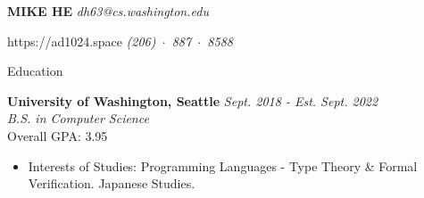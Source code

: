 \documentclass{resume}
\begin{document}
\MakeUppercase{\Large{\textbf{Mike He}}} \hfill {\em{dh63@cs.washington.edu}}
\vspace{-5pt}

https://ad1024.space \hfill{\em (206)~$\cdot$~887~$\cdot$~8588}


	\begin{rSection}{Education}

	{\bf University of Washington, Seattle} \hfill {\em Sept. 2018 - Est. Sept. 2022} \\
	\textit{B.S. in Computer Science} \\
	Overall GPA: 3.95
	\vspace{-5pt}
	\begin{itemize}[leftmargin=*]
		\setlength{\itemsep}{1pt}
		\setlength{\parskip}{0pt}
		\setlength{\parsep}{0pt}
		\item Interests of Studies: Programming Languages - Type Theory \& Formal Verification. Japanese Studies.
	\end{itemize}

	\end{rSection}
\end{document}
